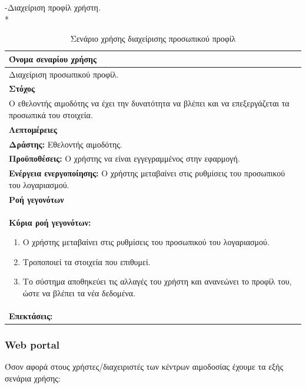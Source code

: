 \newpage
-Διαχείριση προφίλ χρήστη.
\\*
\begin{table}[H]
	\begin{center}
	    \begin{tabular}{|p{\dimexpr \linewidth-2\tabcolsep}|}
	    \hline
	    \rowcolor{grayy}
	    \textbf{Όνομα σεναρίου χρήσης}
	    \\ \hline    
	    Διαχείριση προσωπικού προφίλ. 
	     \\ \hline
	    \rowcolor{grayy}
	    \textbf{\textbf{Στόχος}}
	    \\ \hline
	 	 Ο εθελοντής αιμοδότης να έχει την δυνατότητα να βλέπει και να επεξεργάζεται τα προσωπικά του στοιχεία.
	    \\ \hline
	    \rowcolor{grayy}
	    \textbf{Λεπτομέρειες}
	    \\ \hline
		\textbf{Δράστης:} Εθελοντής αιμοδότης.
		\\*
		\textbf{Προϋποθέσεις:} Ο χρήστης να είναι εγγεγραμμένος στην εφαρμογή.
		\\*
		\textbf{Ενέργεια ενεργοποίησης:} Ο χρήστης μεταβαίνει στις ρυθμίσεις του προσωπικού του λογαριασμού.
		\\ \hline
		\rowcolor{grayy}    
	    \textbf{Ροή γεγονότων}
	    \\ \hline
		\textbf{Κύρια ροή γεγονότων:}
		\begin{enumerate}
			\item	 Ο χρήστης μεταβαίνει στις ρυθμίσεις του προσωπικού του λογαριασμού.
			\item Τροποποιεί τα στοιχεία που επιθυμεί.
			\item Το σύστημα αποθηκεύει τις αλλαγές του χρήστη και ανανεώνει το προφίλ του, ώστε να βλέπει τα νέα δεδομένα.
		\end{enumerate}
		\\ \hline
		\rowcolor{grayy}
		\textbf{Επεκτάσεις:}
		   \\ \hline
	    \end{tabular}
	    \caption{Σενάριο χρήσης διαχείρισης προσωπικού προφίλ}
	    \label{tab:profile_management}
	\end{center}
\end{table}	


 \subsubsection{Web portal}

Όσον αφορά στους χρήστες/διαχειριστές των κέντρων αιμοδοσίας έχουμε τα εξής σενάρια χρήσης:

